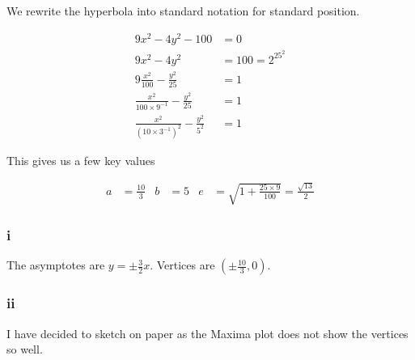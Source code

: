 \documentclass{article}
\begin{document}
We rewrite the hyperbola into standard notation for standard position.

\begin{align*}
	9 x^2 - 4 y^2 - 100                                   & = 0            \\
	9 x^2 - 4 y^2                                         & = 100 = 2^25^2 \\
	9 \frac {x^2} {100} - \frac {y^2} {25}                & = 1            \\
	\frac {x^2} {100\times 9^{-1}} - \frac {y^2} {25}     & = 1            \\
	\frac {x^2} {(10\times 3^{-1})^2} - \frac {y^2} {5^2} & = 1
\end{align*}

This gives us a few key values

\begin{align*}
	a & = \frac {10}3 & b & = 5 & e & = \sqrt {1 + \frac {25\times9}{100}} = \frac {\sqrt{13}}{2}
\end{align*}

\subsubsection {i}

The asymptotes are $y = \pm \frac {3} {2}x$. Vertices are $(\pm \frac {10}3, 0)$.

\subsubsection {ii}

I have decided to sketch on paper as the Maxima plot does not show the vertices so well.
\end{document}
